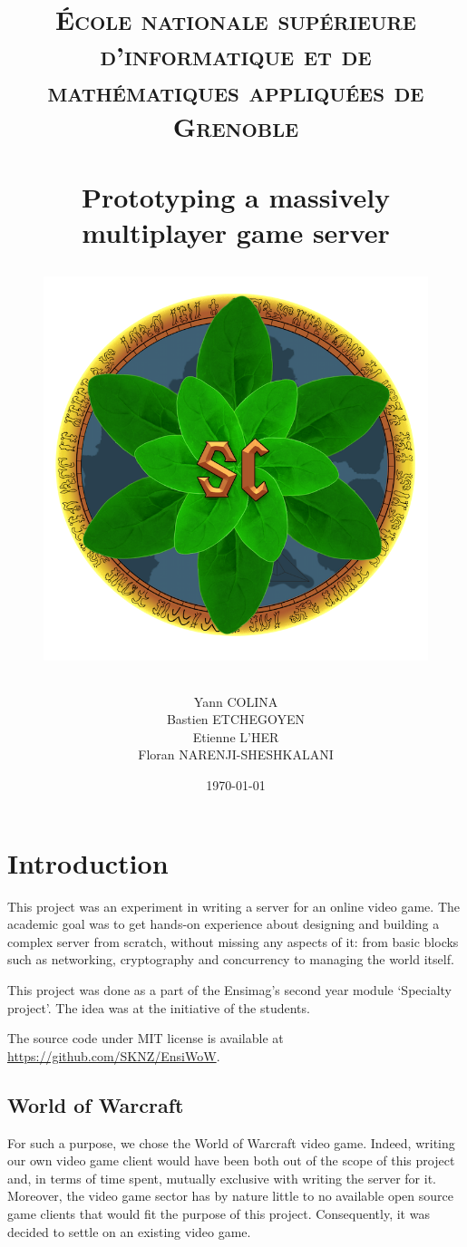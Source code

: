 \documentclass[paper=a4, fontsize=11pt]{scrartcl}
\title{%
    \normalfont{}
    \normalsize{}
    \textsc{École nationale supérieure d'informatique et de mathématiques appliquées de Grenoble} \\ [10pt]
    \horrule{0.5pt} \\[0.4cm]
    \huge Prototyping a massively multiplayer game server
    \horrule{2pt} \\[0.5cm]
    \begin{figure}[htb!]
        \centering
        \includegraphics[width=1\textwidth]{light_spinach}
    \end{figure}
}
\author{Yann COLINA\\
Bastien ETCHEGOYEN\\
Etienne L'HER\\
Floran NARENJI-SHESHKALANI}
\date{\normalsize\today}
\begin{document}
\maketitle

\pagebreak
\tableofcontents
\pagebreak

\section{Introduction}

This project was an experiment in writing a server for an online
video game.
The academic goal was to get hands-on experience about designing and building a
complex server from scratch, without missing any aspects of it: from basic blocks
such as networking, cryptography and concurrency to managing the world itself.

This project was done as a part of the Ensimag's second year module `Specialty
project'.
The idea was at the initiative of the students.

The source code under MIT license is available at
\url{https://github.com/SKNZ/EnsiWoW}.

\subsection{World of Warcraft}

For such a purpose, we chose the World of Warcraft video game.
Indeed, writing our own video game client would have been both out of the scope
of this project and, in terms of time spent, mutually exclusive with writing the
server for it.
Moreover, the video game sector has by nature little to no available open source
game clients that would fit the purpose of this project.
Consequently, it was decided to settle on an existing video game.
\end{document}
